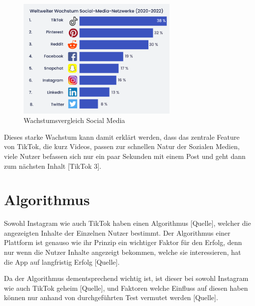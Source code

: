 \documentclass[12pt]{report}
\begin{document}
 
\begin{figure}[h]
	\centering
	\includegraphics[width=0.7\textwidth]{../abbildungen/Social-Media-Wachtstum.png} 
	\caption{Wachstumsvergleich Social Media}
	\label{fig:WachstumsVergleich}
\end{figure}

Dieses starke Wachstum kann damit erklärt werden, dass das zentrale Feature von TikTok, die kurz Videos, passen zur schnellen Natur der Sozialen Medien, viele Nutzer befassen sich nur ein paar Sekunden mit einem Post und geht dann zum nächsten Inhalt [TikTok 3].
\newline





\section{Algorithmus}
Sowohl Instagram wie auch TikTok haben einen Algorithmus [Quelle], welcher die angezeigten Inhalte der Einzelnen Nutzer bestimmt. Der Algorithmus einer Plattform ist genauso wie ihr Prinzip ein wichtiger Faktor für den Erfolg, denn nur wenn die Nutzer Inhalte angezeigt bekommen, welche sie interessieren, hat die App auf langfristig Erfolg [Quelle].
\newline

Da der Algorithmus dementsprechend wichtig ist, ist dieser bei sowohl Instagram wie auch TikTok geheim [Quelle], und Faktoren welche Einfluss auf diesen haben können nur anhand von durchgeführten Test vermutet werden [Quelle].
\end{document}
